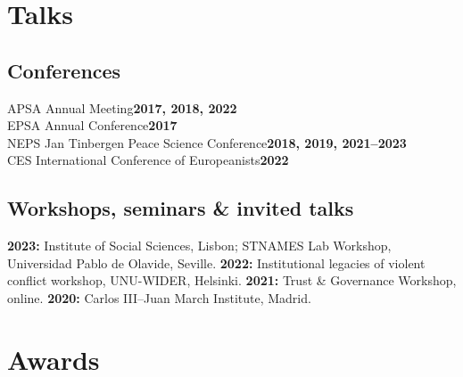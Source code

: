 \documentclass[a4paper, 12pt]{article}
\begin{document}
\section*{Talks}

\subsection*{Conferences}

\noindent
APSA Annual Meeting\hfill\textbf{2017, 2018, 2022}\\
EPSA Annual Conference\hfill\textbf{2017}\\
NEPS Jan Tinbergen Peace Science Conference\hfill\textbf{2018, 2019, 2021--2023}\\
CES International Conference of Europeanists\hfill\textbf{2022}\\\vspace{15pt}


\vspace{-20pt}

\subsection*{Workshops, seminars \& invited talks}

\textbf{2023:} Institute of Social Sciences, Lisbon; STNAMES Lab Workshop, Universidad Pablo de Olavide, Seville. \textbf{2022:} Institutional legacies of violent conflict workshop, UNU-WIDER, Helsinki. \textbf{2021:} Trust \& Governance Workshop, online. \textbf{2020:} Carlos III--Juan March Institute, Madrid.

\section*{Awards}

\end{document}
